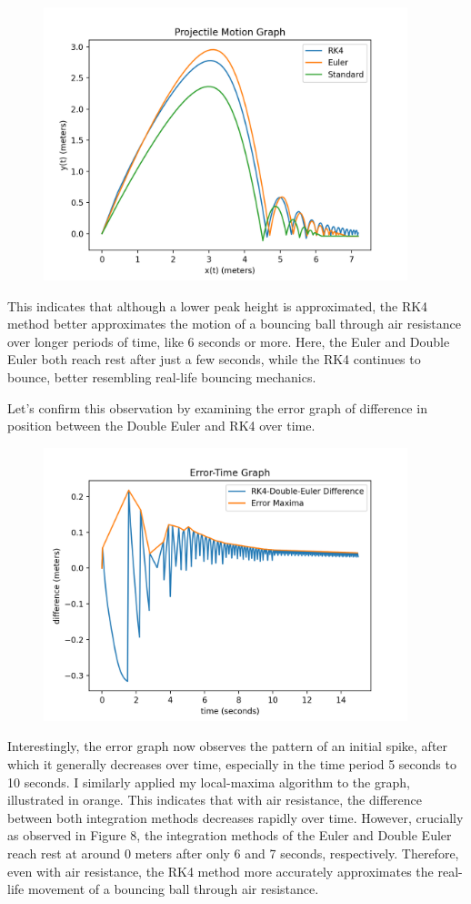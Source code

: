 \documentclass[12pt]{article}
\begin{document}
\begin{figure}[H]
\centering
\includegraphics[width=300pt]{img/air_2.png}
\caption{\label{fig:1}}
\end{figure}

This indicates that although a lower peak height is approximated, the RK4 method better approximates the motion of a bouncing ball through air resistance over longer periods of time, like $6$ seconds or more. Here, the Euler and Double Euler both reach rest after just a few seconds, while the RK4 continues to bounce, better resembling real-life bouncing mechanics. 

Let's confirm this observation by examining the error graph of difference in position between the Double Euler and RK4 over time. 

\begin{figure}[H]
\centering
\includegraphics[width=300pt]{img/drag_error.png}
\caption{\label{fig:1}}
\end{figure}

Interestingly, the error graph now observes the pattern of an initial spike, after which it generally decreases over time, especially in the time period 5 seconds to 10 seconds. I similarly applied my local-maxima algorithm to the graph, illustrated in orange. This indicates that with air resistance, the difference between both integration methods decreases rapidly over time. However, crucially as observed in Figure 8, the integration methods of the Euler and Double Euler reach rest at around 0 meters after only 6 and 7 seconds, respectively. Therefore, even with air resistance, the RK4 method more accurately approximates the real-life movement of a bouncing ball through air resistance.
\end{document}
